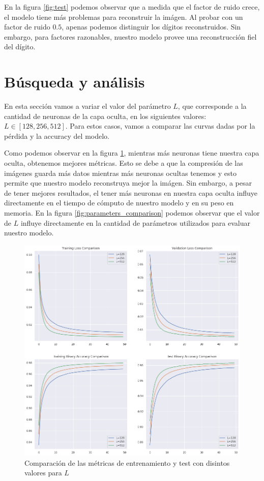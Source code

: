 \documentclass [a4paper,12pt,oneside,final]{article}
\begin{document}
En la figura \ref{fig:test} podemos observar que a medida que el factor de ruido crece, el modelo tiene más problemas para reconstruir la imágen. Al probar con un factor de ruido $0.5$, apenas podemos distinguir los dígitos reconstruidos. Sin embargo, para factores razonables, nuestro modelo provee una reconstrucción fiel del dígito. 

\section{Búsqueda y análisis}

En esta sección vamos a variar el valor del parámetro $L$, que corresponde a la cantidad de neuronas de la capa oculta, en los siguientes valores: $L \in [128, 256, 512]$. Para estos casos, vamos a comparar las curvas dadas por la pérdida y la accuracy del modelo.

Como podemos observar en la figura \ref{fig:metrics_comparison}, mientras más neuronas tiene nuestra capa oculta, obtenemos mejores métricas. Esto se debe a que la compresión de las imágenes guarda más datos mientras más neuronas ocultas tenemos y esto permite que nuestro modelo reconstruya mejor la imágen. Sin embargo, a pesar de tener mejores resultados, el tener más neuronas en nuestra capa oculta influye directamente en el tiempo de cómputo de nuestro modelo y en su peso en memoria. En la figura \ref{fig:parameters_comparison} podemos observar que el valor de $L$ influye directamente en la cantidad de parámetros utilizados para evaluar nuestro modelo. 

\begin{figure}[ht]
  \centering
  \includegraphics[width=13cm,keepaspectratio]{./graficos/metrics_comparison.png}
  \caption{Comparación de las métricas de entrenamiento y test con disintos valores para $L$}\label{fig:metrics_comparison}
\end{figure}
\end{document}
